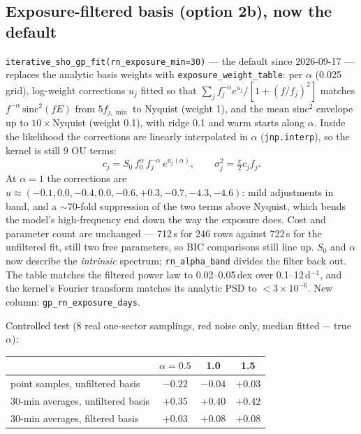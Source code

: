 \documentclass[11pt]{article}
\newcommand{\code}[1]{\texttt{#1}}
\begin{document}
\subsection{Exposure-filtered basis (option 2b), now the default}

\code{iterative\_sho\_gp\_fit(rn\_exposure\_min=30)} --- the default since 2026-09-17 ---
replaces the analytic basis weights with
\code{exposure\_weight\_table}: per $\alpha$ (0.025 grid), log-weight corrections $u_j$ fitted
so that $\sum_j f_j^{-\alpha}e^{u_j}/[1+(f/f_j)^2]$ matches $f^{-\alpha}\,\mathrm{sinc}^2(fE)$
from $5 f_{j,\min}$ to Nyquist (weight 1), and the mean sinc$^2$ envelope up to
$10\times$Nyquist (weight 0.1), with ridge 0.1 and warm starts along $\alpha$. Inside the
likelihood the corrections are linearly interpolated in $\alpha$ (\code{jnp.interp}), so the
kernel is still 9 OU terms:
\begin{equation}
c_j = S_0\,f_0^{\alpha}\,f_j^{-\alpha}\,e^{u_j(\alpha)},
\qquad \sigma_j^2 = \tfrac{\pi}{2} c_j f_j .
\end{equation}
At $\alpha=1$ the corrections are $u \approx (-0.1, 0.0, -0.4, 0.0, -0.6, +0.3, -0.7,
-4.3, -4.6)$: mild adjustments in band, and a $\sim$70-fold suppression of the two terms
above Nyquist, which bends the model's high-frequency end down the way the exposure does.
Cost and parameter count are unchanged --- 712\,s for 246 rows against 722\,s for the
unfiltered fit, still two free parameters, so BIC comparisons still line up. $S_0$ and $\alpha$ now describe
the \emph{intrinsic} spectrum; \code{rn\_alpha\_band} divides the filter back out. The table
matches the filtered power law to 0.02--0.05\,dex over 0.1--12\,d$^{-1}$, and the kernel's
Fourier transform matches its analytic PSD to $<3\times10^{-6}$. New column:
\code{gp\_rn\_exposure\_days}.

Controlled test (8 real one-sector samplings, red noise only, median fitted $-$ true $\alpha$):

\begin{center}
\begin{tabular}{lccc}
\toprule
 & $\alpha=0.5$ & 1.0 & 1.5 \\
\midrule
point samples, unfiltered basis     & $-0.22$ & $-0.04$ & $+0.03$ \\
30-min averages, unfiltered basis   & $+0.35$ & $+0.40$ & $+0.42$ \\
30-min averages, filtered basis     & $+0.03$ & $+0.08$ & $+0.08$ \\
\bottomrule
\end{tabular}
\end{center}
\end{document}
